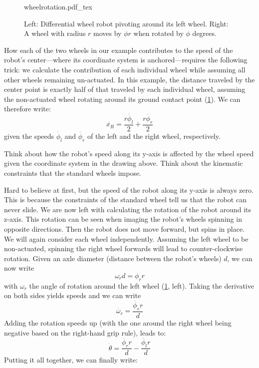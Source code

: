 \begin{figure}[htb!]
    \centering
    \def\svgwidth{0.86\textwidth}
    {wheelrotation.pdf_tex}
    \caption{Left: Differential wheel robot pivoting around its left wheel. Right: A wheel with radius $r$ moves by $\phi r$ when rotated by $\phi$ degrees.}
    \label{fig:wheelrotation}
\end{figure}



How each of the two wheels in our example contributes to the speed of the robot's center---where its coordinate system is anchored---requires the following trick: we calculate the contribution of each individual wheel while assuming all other wheels remaining un-actuated.
In this example, the distance traveled by the center point is exactly half of that traveled by each individual wheel, assuming the non-actuated wheel rotating around its ground contact point (\cref{fig:wheelrotation}). We can therefore write:
\begin{equation}
\dot{x_R}=\frac{r\dot{\phi_l}}{2}+\frac{r\dot{\phi_r}}{2}
\end{equation}
given the speeds $ \dot{\phi_l}$ and $ \dot{\phi_r}$ of the left and the right wheel, respectively.

\begin{mdframed}
Think about how the robot's speed along its y-axis is affected by the wheel speed given the coordinate system in the drawing above. Think about the kinematic constraints that the standard wheels impose.
\end{mdframed}

Hard to believe at first, but the speed of the robot along its y-axis is always zero. This is because the constraints of the standard wheel tell us that the robot can never slide.
We are now left with calculating the rotation of the robot around its z-axis. This rotation can be seen when imaging the robot's wheels spinning in opposite directions. Then the robot does not move forward, but spins in place.
We will again consider each wheel independently. Assuming the left wheel to be non-actuated, spinning the right wheel forwards will lead to counter-clockwise rotation. Given an axle diameter (distance between the robot's wheels) $d$, we can now write
\begin{equation}
\omega_r d = \phi_r r
\end{equation}
with $\omega_r$ the angle of rotation around the left wheel (\cref{fig:wheelrotation}, left). Taking the derivative on both sides yields speeds and we can write
\begin{equation}
\dot{\omega_r} = \frac{\dot{\phi_r} r}{d}
\end{equation}
Adding the rotation speeds up (with the one around the right wheel being negative based on the right-hand grip rule), leads to:
%
\begin{equation}
\dot{\theta}=\frac{\dot{\phi_r} r}{d}-\frac{\dot{\phi_l} r}{d}
\end{equation}
%
Putting it all together, we can finally write:

